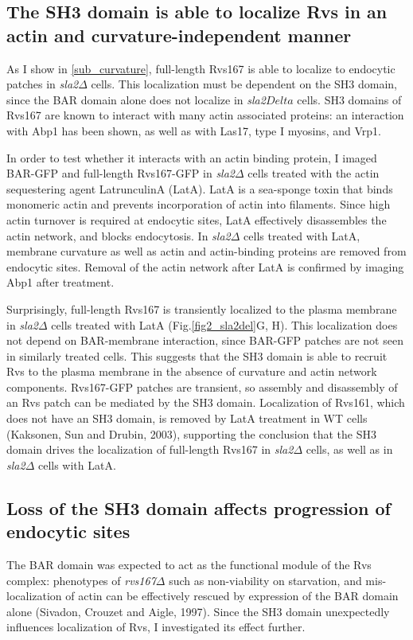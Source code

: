 	\subsection{The SH3 domain is able to localize Rvs in an actin and curvature-independent manner}
	\label{delsh3_latA}
As I show in \ref{sub_curvature}, full-length Rvs167 is able to localize to endocytic patches in \textit{sla2$\Delta$} cells. This localization must be dependent on the SH3 domain, since the BAR domain alone does not localize in \textit{sla2$Delta$} cells. SH3 domains of Rvs167 are known to interact with many actin associated proteins: an interaction with Abp1 has been shown, as well as with Las17, type I myosins, and Vrp1. 

	\vspace{5mm}
	
In order to test whether it interacts with an actin binding protein, I imaged BAR-GFP and full-length Rvs167-GFP in \textit{sla2$\Delta$} cells treated with the actin sequestering agent LatrunculinA (LatA). LatA is a sea-sponge toxin that binds monomeric actin and prevents incorporation of actin into filaments. Since high actin turnover is required at endocytic sites, LatA effectively disassembles the actin network, and blocks endocytosis. In \textit{sla2$\Delta$} cells treated with LatA, membrane curvature as well as actin and actin-binding proteins are removed from endocytic sites. Removal of the actin network after LatA is confirmed by imaging Abp1 after treatment.

	\vspace{5mm}
Surprisingly, full-length Rvs167 is transiently localized to the plasma membrane in \textit{sla2$\Delta$} cells treated with LatA (Fig.\ref{fig2_sla2del}G, H). This localization does not depend on BAR-membrane interaction, since BAR-GFP patches are not seen in similarly treated cells. This suggests that the SH3 domain is able to recruit Rvs to the plasma membrane in the absence of curvature and actin network components. Rvs167-GFP patches are transient, so assembly and disassembly of an Rvs patch can be mediated by the SH3 domain. Localization of Rvs161, which does not have an SH3 domain, is removed by LatA treatment in WT cells (Kaksonen, Sun and Drubin, 2003), supporting the conclusion that the SH3 domain drives the localization of full-length Rvs167 in \textit{sla2$\Delta$}  cells, as well as in \textit{sla2$\Delta$} cells with LatA. 


	\subsection{Loss of the SH3 domain affects progression of \\endocytic sites}
	\label{delsh3_movement}
The BAR domain was expected to act as the functional module of the Rvs complex: phenotypes of \textit{rvs167$\Delta$}  such as non-viability on starvation, and mis-localization of actin can be effectively rescued by expression of the BAR domain alone (Sivadon, Crouzet and Aigle, 1997). Since the SH3 domain unexpectedly influences localization of Rvs, I investigated its effect further.

